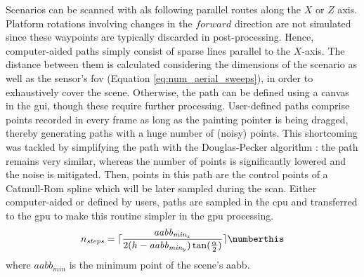 Scenarios can be scanned with \acrshort{als} following parallel routes along the $X$ or $Z$ axis. Platform rotations involving changes in the $\textit{forward}$ direction are not simulated since these waypoints are typically discarded in post-processing. Hence, computer-aided paths simply consist of sparse lines parallel to the $X$-axis. The distance between them is calculated considering the dimensions of the scenario as well as the sensor's \acrshort{fov} (Equation \ref{eq:num_aerial_sweeps}), in order to exhaustively cover the scene. Otherwise, the path can be defined using a canvas in the \acrshort{gui}, though these require further processing. User-defined paths comprise points recorded in every frame as long as the painting pointer is being dragged, thereby generating paths with a huge number of (noisy) points. This shortcoming was tackled by simplifying the path with the Douglas-Pecker algorithm \cite{douglas_algorithms_1973}: the path remains very similar, whereas the number of points is significantly lowered and the noise is mitigated. Then, points in this path are the control points of a Catmull-Rom spline which will be later sampled during the scan. Either computer-aided or defined by users, paths are sampled in the \acrshort{cpu} and transferred to the \acrshort{gpu} to make this routine simpler in the \acrshort{gpu} processing. 
\begin{equation}
    n_{\textit{steps}} = \lceil{\frac{\textit{aabb}_{\textit{min}_z}}{2(h - \textit{aabb}_{\textit{min}_y})\tan(\frac{\alpha}{2})}\rceil}
    \numberthis \label{eq:num_aerial_sweeps}
\end{equation}
where $\textit{aabb}_{\textit{min}}$ is the minimum point of the scene's \acrshort{aabb}.

